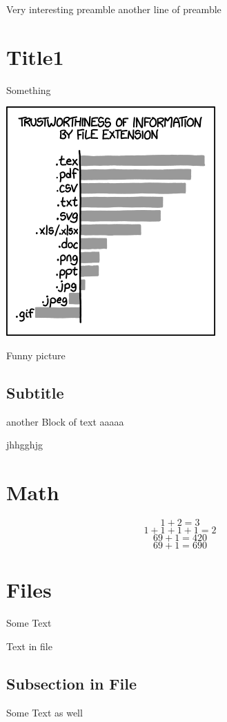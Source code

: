 Very interesting preamble
another line of preamble

\section{Title1}
Something

\includegraphics{image.png}
\caption{Funny picture}
\subsection{Subtitle}
another Block of text
aaaaa

jhhgghjg

\section{Math}
\label{math}
$$1+2 = 3$$
\[1+1+1+1=2\]
\begin{displaymath}
69 + 1 = 420
\end{displaymath}
\begin{equation}
69 + 1 = 690
\end{equation}
\section{Files}
Some Text

Text in file

\subsection{Subsection in File}
Some Text as well

